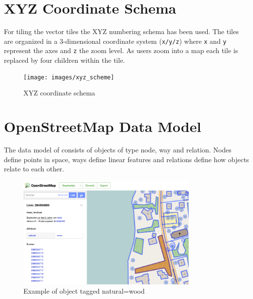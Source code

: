\section{XYZ Coordinate Schema}\label{part1_xyz_coordinates}

\noindent\begin{minipage}[t]{0.48\linewidth}
    \vspace{0pt}
    For tiling the vector tiles the XYZ numbering schema has been used.
    The tiles are organized in a 3-dimensional coordinate system (\texttt{x/y/z}) where \texttt{x} and \texttt{y} represent the axes and \texttt{z} the zoom level. As users zoom into a map each tile is replaced by four children within the tile.
\end{minipage}
\hfill
\begin{minipage}[t]{0.48\linewidth}
    \vspace{-10pt}
    \begin{figure}[H]
    \centering
    \texttt{[image: images/xyz\_scheme]}
    \caption{XYZ coordinate schema}
    \end{figure}
\end{minipage}



\section{OpenStreetMap Data Model}\label{openstreetmap_data_model}

The data model of \osm{} consists of objects of type node, way and relation. Nodes define points in space, ways define linear features and relations define how objects relate to each other\cite{1_osm_wiki_2016}.

\begin{figure}[H]
    \centering
    \includegraphics[width=0.8\textwidth]{images/osm_data_model}
    \caption{Example of object tagged natural=wood}
    \label{landuse_on_osm_editor}
\end{figure}

